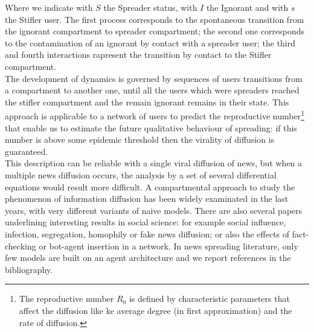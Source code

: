 Where we indicate with $S$ the Spreader status, with $I$ the Ignorant and with $s$ the Stifler user. 
The first process corresponds to the spontaneous transition from the ignorant compartment to spreader compartment;
 the second one corresponds to the contamination of an ignorant by contact with a spreader user; 
the third and fourth interactions rapresent the transition by contact to the Stifler compartment.  \\
The development of dynamics is governed by sequences of users transitions from a compartment to another one, until all the users which were spreaders reached the stifler compartment and the remain ignorant remains in their state.
This approach is applicable to a network of users to predict the reproductive 
number\footnote{The reproductive number $R_{0}$ is defined by characteristic parameters that affect the diffusion like ke average degree (in first approximation) and the rate of diffusion. } 
that enable us to estimate the future qualitative behaviour of spreading: 
if this number is above some epidemic threshold then the virality of diffusion is guaranteed.\\
This description can be reliable with a single viral diffusion of news, but when a
multiple news diffusion occurs, the analysis by a set of several differential equations would result more difficult.  
 A compartmental approach to study the phenomenon of information diffusion has been widely examinated in the last years, with very different variants of naive models.
There are also several papers underlining interesting results in social science: for example social influence, infection, segregation, homophily or fake news diffusion; or also the effects of fact-checking or bot-agent insertion in a network.
 In news spreading literature, only few models are built on an agent architecture and we report references in the bibliography.


